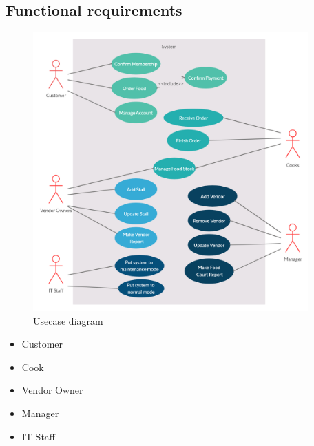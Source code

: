 \subsection{Functional requirements}
\begin{figure}[H]
    \centering
        \includegraphics[width=400px]{images/usecase-diagram.png}
    \caption{Usecase diagram}
\end{figure}
\begin{itemize}

\item Customer


\item Cook


\item Vendor Owner


\item Manager


\item IT Staff


\end{itemize}


